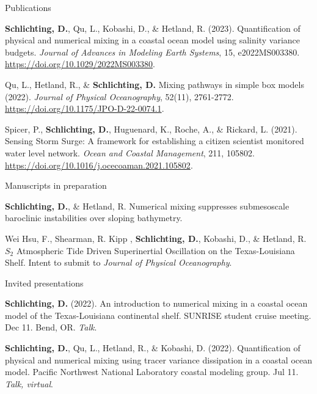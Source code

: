 \documentclass{resume} %
\begin{document}
\begin{rSection}{Publications}
\vspace{-3pt}

\begin{etaremune}
\item \textbf{Schlichting, D.}, Qu, L., Kobashi, D., \& Hetland, R. (2023). Quantification of physical and numerical mixing in a coastal ocean model using salinity variance budgets. \textit{Journal of Advances in Modeling Earth Systems},
15, e2022MS003380. \url{https://doi.org/10.1029/2022MS003380}.
\item Qu, L., Hetland, R., \& \textbf{Schlichting, D.} Mixing pathways in simple box models (2022). \textit{Journal of Physical Oceanography}, 52(11), 2761-2772. \url{https://doi.org/10.1175/JPO-D-22-0074.1}.
\item Spicer, P., \textbf{Schlichting, D.}, Huguenard, K., Roche, A., \& Rickard, L. (2021). Sensing Storm Surge: A framework for establishing a citizen scientist monitored water level network. \textit{Ocean and Coastal Management}, 211, 105802. \url{https://doi.org/10.1016/j.ocecoaman.2021.105802}.
\end{etaremune}
\end{rSection}

\begin{rSection}{Manuscripts in preparation}
\vspace{-3pt}
\begin{etaremune}
\item \textbf{Schlichting, D.}, \& Hetland, R. Numerical mixing suppresses submesoscale baroclinic instabilities over sloping bathymetry.
\item Wei Hsu, F., Shearman, R. Kipp , \textbf{Schlichting, D.}, Kobashi, D., \& Hetland, R. $S_2$ Atmospheric Tide Driven Superinertial Oscillation on the Texas-Louisiana Shelf. Intent to submit to \textit{Journal of Physical Oceanography}.
\end{etaremune}
\end{rSection}

\begin{rSection}{Invited presentations}
\vspace{-3pt}

\begin{etaremune}
    \item \textbf{Schlichting, D.} (2022). An introduction to numerical mixing in a coastal ocean model of the Texas-Louisiana continental shelf. SUNRISE student cruise meeting. Dec 11. Bend, OR. \textit{Talk}.
    \item \textbf{Schlichting, D.}, Qu, L., Hetland, R., \& Kobashi, D. (2022). Quantification of physical and numerical mixing using tracer variance dissipation in a coastal ocean model. Pacific Northwest National Laboratory coastal modeling group. Jul 11. \textit{Talk, virtual}.
\end{etaremune}
\end{rSection}
\end{document}
